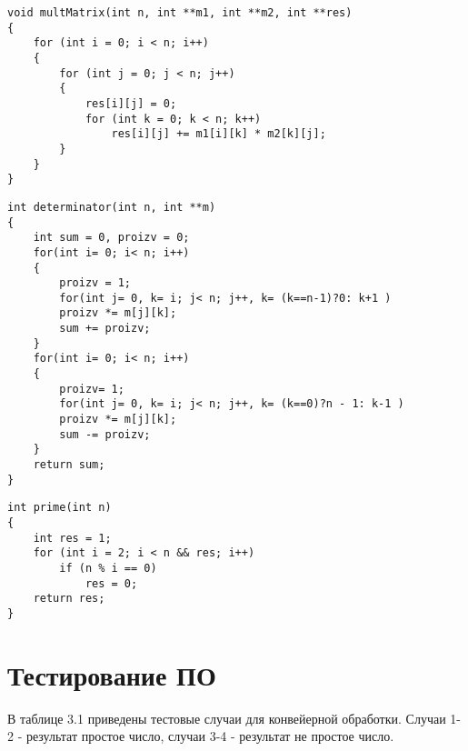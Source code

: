 \begin{lstlisting}[caption=Функция вычисления произведения матриц (первая лента)]
void multMatrix(int n, int **m1, int **m2, int **res)
{
	for (int i = 0; i < n; i++)
	{
		for (int j = 0; j < n; j++)
		{
			res[i][j] = 0;
			for (int k = 0; k < n; k++)
				res[i][j] += m1[i][k] * m2[k][j];
		}
	}
}
\end{lstlisting}

\begin{lstlisting}[caption=Функция вычисления определителя матрицы (вторая лента)]
int determinator(int n, int **m)
{
	int sum = 0, proizv = 0;
	for(int i= 0; i< n; i++)
	{
		proizv = 1;
		for(int j= 0, k= i; j< n; j++, k= (k==n-1)?0: k+1 )
		proizv *= m[j][k];
		sum += proizv;
	}
	for(int i= 0; i< n; i++)
	{
		proizv= 1;
		for(int j= 0, k= i; j< n; j++, k= (k==0)?n - 1: k-1 )
		proizv *= m[j][k];
		sum -= proizv;
	}
	return sum;
}
\end{lstlisting}

\begin{lstlisting}[caption=Функция проверки числа на простоту]
int prime(int n)
{
	int res = 1;
	for (int i = 2; i < n && res; i++)
		if (n % i == 0)
			res = 0;
	return res;
}
\end{lstlisting}
\captionsetup{singlelinecheck = false, justification=centering}

\section{Тестирование ПО}

В таблице 3.1 приведены тестовые случаи для конвейерной обработки.
Случаи 1-2 - результат простое число, случаи 3-4 - результат не простое число.

